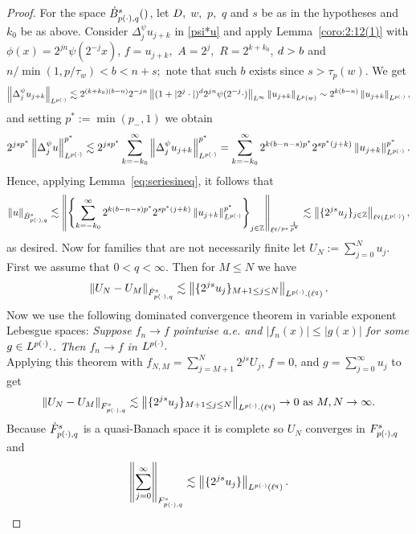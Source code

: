 {\begin{proof}
For the space $\besw{\pp}{s}{q}$, let $\A,$ $w,$ $p,$ $q$ and $s$ be as in the hypotheses and $k_0$ be as above. 
Consider $\Delta^\psi_j  u_{j+k}$  in  \eqref{psi*u} and  apply  Lemma~\ref{coro:2:12(1)}  with $\phi(x)=2^{jn}\psi(2^{-j} x)$, $f= u_{j+k},$ $A=2^{j},$ $R=2^{k +  k_0}$,  $\ex>b$ and $  n /\min(1,p/\tau_w)<b<n+s;$ note that such $b$ exists since $s>\tau_p(w).$ We get
\begin{align*}
 \norm{\Delta^\psi_j  u_{j+k}}{\Lp}  \lesssim 2^{(k + k_0)(b-n)} 2^{- j  n} \norm{(1 + |2^j \cdot|)^\ex 2^{jn}\psi(2^{-j}\cdot)}{L^\infty} \norm{u_{j+k}}{L^p(w)}\sim 2^{k(b-n)}   \norm{u_{j+k}}{\Lp},
\end{align*}
and setting $p^*:=\min(p_-,1)$ we obtain
\begin{align*}
2^{js p^*}\norm{\Delta^\psi_j  u}{\Lp}^{p^*} \lesssim 2^{js p^*}\sum_{k = - k_0}^\infty \norm{\Delta^\psi_j  u_{j+k}}{\Lp}^{p^*}
 =  \sum_{k = - k_0}^\infty 2^{k(b-n -s) p^*} 2^{s p^* (j+k)}   \norm{u_{j+k}}{\Lp}^{p^*}.
\end{align*}
Hence, applying Lemma~\ref{eq:seriesineq}, it follows that
\[
\norm{u}{\bes{\pp}{s}{q}}  
\lesssim  
\norm{\left\{ \sum_{k = - k_0}^\infty 2^{k(b-n -s) p^*}  2^{s p^* (j+k)}   \norm{u_{j+k}}{\Lp}^{p^*}\right\}_{j\in\ent}}{{\ell^{q/p*}}^\frac{1}{p^*}}
\lesssim  
\norm{\{2^{js} u_j\}_{j\in\ent}}{\ell^{q}(\Lp)}, 
\]
as desired.
Now for families that are not necessarily finite let $U_N := \sum_{j=0}^N u_j$. First we assume that $0<q<\infty$. Then for $M\leq N$ we have
\begin{equation}
\norm{U_N -U_M}{\tl{\pp}{s}{q}} \lesssim \norm{\{2^{js} u_j\}_{M+1\leq j \leq N}}{\Lp.(\ell^q)}.
\end{equation}
Now we use the following dominated convergence theorem in variable exponent Lebesgue spaces: 
\textit{Suppose $f_n \rightarrow f$ pointwise a.e. and $|f_n (x)| \leq |g(x)|$ for some $g\in \Lp.$. Then $f_n \rightarrow f$ in $\Lp.$}
\\
\medskip
Applying this theorem with $f_{N,M} = \sum_{j=M+1}^N 2^{js}U_j$, $f = 0$, and $g = \sum_{j=0}^\infty u_j$ to get 
\begin{equation}
\norm{U_N -U_M}{\itl{\pp}{s}{q}} \lesssim \norm{\{2^{js} u_j\}_{M+1\leq j \leq N}}{\Lp.(\ell^q)} \rightarrow 0 \text{ as } M,N \rightarrow \infty.
\end{equation}
Because $\tl{\pp}{s}{q}$ is a quasi-Banach space it is complete so $U_N$ converges in $\itl{\pp}{s}{q}$ and 
\begin{equation}
\norm{\sum_{j=0}^\infty}{\itl{\pp}{s}{q}} \lesssim \norm{\{2^{js} u_j\}}{\Lp(\ell^q)}.
\end{equation}


\end{proof}}
